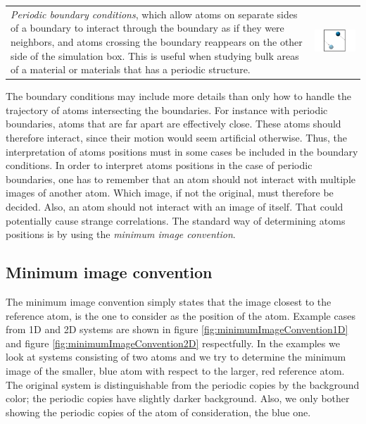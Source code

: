 \documentclass[twoside,english]{uiofysmaster}
\begin{document}
\begin{tabular}{p{} p{}}
	 \vspace{0pt} {\it Periodic boundary conditions}, which allow atoms on separate sides of a boundary to interact through the boundary as if they were neighbors, and atoms crossing the boundary reappears on the other side of the simulation box. This is useful when studying bulk areas of a material or materials that has a periodic structure.
	& \vspace{0pt} \hspace*{-1.3cm} \includegraphics[width=1.3\linewidth]{figures/BoundaryConditions/periodic.pdf}
\end{tabular}
\vspace{10mm}

\noindent
The boundary conditions may include more details than only how to handle the trajectory of atoms intersecting the boundaries. 
For instance with periodic boundaries, atoms that are far apart are effectively close. 
These atoms should therefore interact, since their motion would seem artificial otherwise. 
Thus, the interpretation of atoms positions must in some cases be included in the boundary conditions. 
In order to interpret atoms positions in the case of periodic boundaries, one has to remember that an atom should not interact with multiple images of another atom. 
Which image, if not the original, must therefore be decided. 
Also, an atom should not interact with an image of itself. That could potentially cause strange correlations. 
The standard way of determining atoms positions is by using the {\it minimum image convention}.


\subsection{Minimum image convention}
The minimum image convention simply states that the image closest to the reference atom, is the one to consider as the position of the atom. 
Example cases from 1D and 2D systems are shown in figure \ref{fig:minimumImageConvention1D} and figure \ref{fig:minimumImageConvention2D} respectfully. 
In the examples we look at systems consisting of two atoms and we try to determine the minimum image of the smaller, blue atom with respect to the larger, red reference atom. The original system is distinguishable from the periodic copies by the background color; the periodic copies have slightly darker background. Also, we only bother showing the periodic copies of the atom of consideration, the blue one. 
\end{document}
